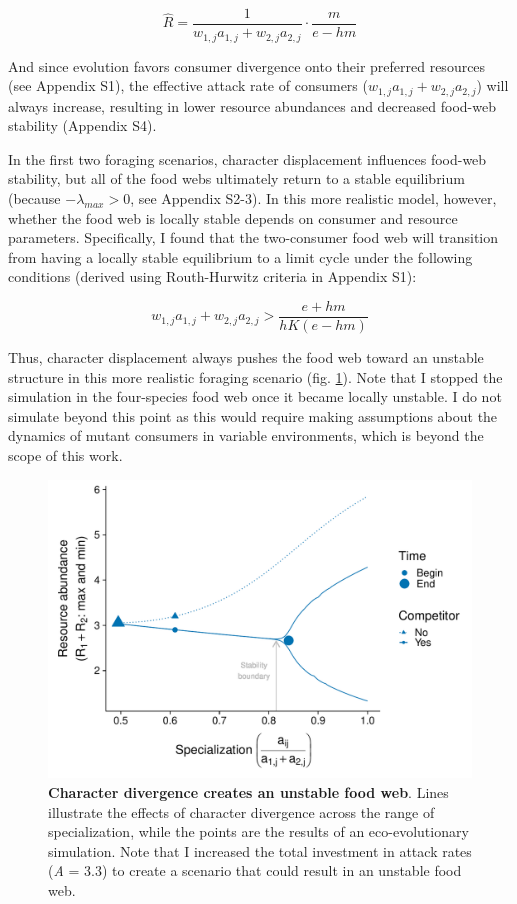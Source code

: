 \documentclass[11pt,]{article}
\begin{document}
\begin{equation} \label{eq:7}
  \hat{R}=\frac{1}{w_{1,j}a_{1,j}+w_{2,j}a_{2,j}}\cdot\frac{m}{e-hm}
\end{equation}

And since evolution favors consumer divergence onto their preferred
resources (see Appendix S1), the effective attack rate of consumers
(\(w_{1,j}a_{1,j}+w_{2,j}a_{2,j}\)) will always increase, resulting in
lower resource abundances and decreased food-web stability (Appendix
S4).

In the first two foraging scenarios, character displacement influences
food-web stability, but all of the food webs ultimately return to a
stable equilibrium (because \(-\lambda_{max}>0\), see Appendix S2-3). In
this more realistic model, however, whether the food web is locally
stable depends on consumer and resource parameters. Specifically, I
found that the two-consumer food web will transition from having a
locally stable equilibrium to a limit cycle under the following
conditions (derived using Routh-Hurwitz criteria in Appendix S1):

\begin{equation} \label{eq:8}
  w_{1,j}a_{1,j}+w_{2,j}a_{2,j} > \frac{e+hm}{hK(e-hm)}
\end{equation}

Thus, character displacement always pushes the food web toward an
unstable structure in this more realistic foraging scenario (fig.
\ref{fig:bifur_plot}). Note that I stopped the simulation in the
four-species food web once it became locally unstable. I do not simulate
beyond this point as this would require making assumptions about the
dynamics of mutant consumers in variable environments, which is beyond
the scope of this work.

\begin{figure}
\centering
\includegraphics{bifurcation_plot.pdf}
\caption{\label{fig:bifur_plot}\textbf{Character divergence creates an
unstable food web}. Lines illustrate the effects of character divergence
across the range of specialization, while the points are the results of
an eco-evolutionary simulation. Note that I increased the total
investment in attack rates (\emph{A} = 3.3) to create a scenario that
could result in an unstable food web.}
\end{figure}
\end{document}
